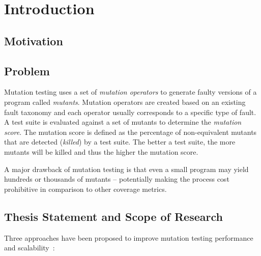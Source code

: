 \chapter{Introduction}
\label{chap:introduction}


\section{Motivation}
\label{sec:introduction_motivation}


\section{Problem}
\label{sec:introduction_problem}
Mutation testing uses a set of \emph{mutation operators} to generate faulty versions of a program called \emph{mutants}. Mutation operators are created based on an existing fault taxonomy and each operator usually corresponds to a specific type of fault. A test suite is evaluated against a set of mutants to determine the \emph{mutation score}. The mutation score is defined as the percentage of non-equivalent mutants that are detected (\emph{killed}) by a test suite. The better a test suite, the more mutants will be killed and thus the higher the mutation score.

A major drawback of mutation testing is that even a small program may yield hundreds or thousands of mutants -- potentially making the process cost prohibitive in comparison to other coverage metrics.


\section{Thesis Statement and Scope of Research}
\label{sec:introduction_statement_and_scope}
Three approaches have been proposed to improve mutation testing performance and scalability~\cite{OU00}:

